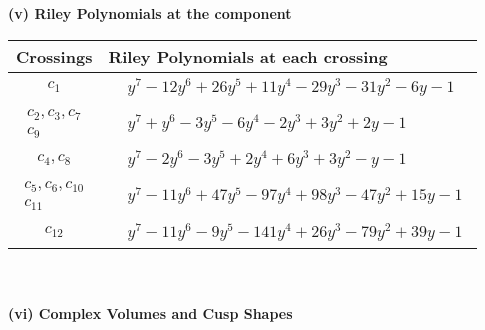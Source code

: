 \documentclass[1p]{elsarticle_modified}
\theoremstyle{definition}
\begin{document}
\newpage\renewcommand{\arraystretch}{1}
\flushleft \textbf{(v) Riley Polynomials at the component}\newline \\
\begin{tabular}{m{50pt}|m{274pt}}
Crossings & \hspace{64pt}Riley Polynomials at each crossing \\
\hline $$\begin{aligned}c_{1}\end{aligned}$$&$\begin{aligned}
&y^7-12 y^6+26 y^5+11 y^4-29 y^3-31 y^2-6 y-1
\end{aligned}$\\
\hline $$\begin{aligned}c_{2},c_{3},c_{7}\\c_{9}\end{aligned}$$&$\begin{aligned}
&y^7+y^6-3 y^5-6 y^4-2 y^3+3 y^2+2 y-1
\end{aligned}$\\
\hline $$\begin{aligned}c_{4},c_{8}\end{aligned}$$&$\begin{aligned}
&y^7-2 y^6-3 y^5+2 y^4+6 y^3+3 y^2- y-1
\end{aligned}$\\
\hline $$\begin{aligned}c_{5},c_{6},c_{10}\\c_{11}\end{aligned}$$&$\begin{aligned}
&y^7-11 y^6+47 y^5-97 y^4+98 y^3-47 y^2+15 y-1
\end{aligned}$\\
\hline $$\begin{aligned}c_{12}\end{aligned}$$&$\begin{aligned}
&y^7-11 y^6-9 y^5-141 y^4+26 y^3-79 y^2+39 y-1
\end{aligned}$\\
\hline
\end{tabular}\\~\\
\newpage\flushleft \textbf{(vi) Complex Volumes and Cusp Shapes}
\end{document}

